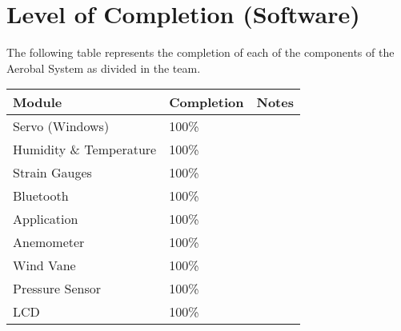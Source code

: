 \section{Level of Completion (Software)}

	The following table represents the completion of each of the components of the Aerobal System as divided in the team.
	\\

	\noindent
	\renewcommand{\arraystretch}{1.5}
	\begin{tabular}{|p{4.0cm}|p{2.5cm}|p{8.0cm}|}
		\hline
			\textbf{Module} & \textbf{Completion} & \textbf{Notes}\\
		\hline
			Servo (Windows) & 100\% & \\
		\hline
			Humidity \& Temperature & 100\% & \\
		\hline
			Strain Gauges & 100\% & \\
		\hline
			Bluetooth & 100\% & \\
		\hline
			Application & 100\% & \\
		\hline
			Anemometer & 100\% & \\
		\hline
			Wind Vane & 100\% & \\
		\hline
			Pressure Sensor & 100\% & \\
		\hline
			LCD &  100\% & \\
		\hline
	\end{tabular} \\

